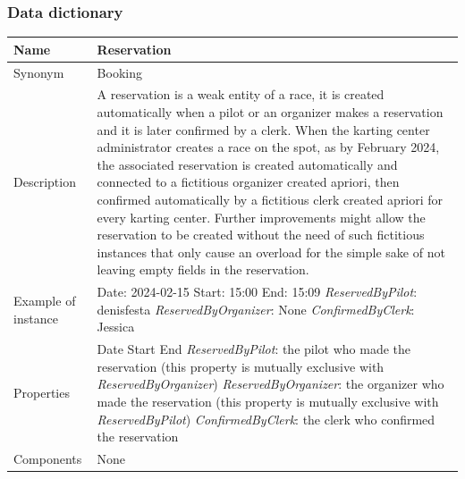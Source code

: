 \documentclass{beamer}
\begin{document}
\begin{frame}
\frametitle{Data dictionary}
\begin{table}
\tiny
\begin{tabular}{|p{2cm}|p{6cm}|}
\hline
Name & \textbf{Reservation} \\
\hline
Synonym & Booking \\
\hline
Description & A reservation is a weak entity of a race,
it is created automatically when a pilot or an organizer 
makes a reservation and it is later confirmed by a clerk.
When the karting center administrator creates 
a race on the spot, as by February 2024, the associated
reservation is created automatically and connected to a 
fictitious organizer created apriori, then confirmed automatically
by a fictitious clerk created apriori for every karting center.
Further improvements might allow the reservation to be created
without the need of such fictitious instances that only 
cause an overload for the simple sake of not leaving empty fields 
in the reservation. \\ 
\hline
Example of instance &
Date: 2024-02-15 \newline
Start: 15:00 \newline
End: 15:09 \newline
\textit{ReservedByPilot}: denisfesta \newline
\textit{ReservedByOrganizer}: None \newline
\textit{ConfirmedByClerk}: Jessica \\
\hline
Properties &
Date \newline
Start \newline
End \newline
\textit{ReservedByPilot}: the pilot who made the reservation (this property 
is mutually exclusive with \textit{ReservedByOrganizer}) \newline
\textit{ReservedByOrganizer}: the organizer who made the reservation (this property
is mutually exclusive with \textit{ReservedByPilot}) \newline
\textit{ConfirmedByClerk}: the clerk who confirmed the reservation \\
\hline
Components & None \\
\hline
\end{tabular}
\end{table}
\end{frame}
\end{document}
